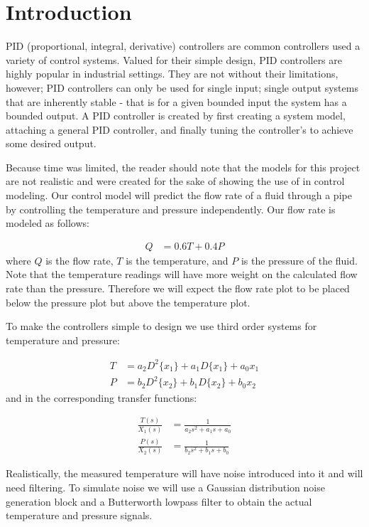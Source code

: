 \documentclass[main.tex]{subfile}
\begin{document}
\section{Introduction} 
\label{sec:introduction}

PID (proportional, integral, derivative) controllers are common controllers used
a variety of control systems. Valued for their simple design, PID controllers 
are highly popular in industrial settings. They are not without their limitations, 
however; PID controllers can only be used for single input; single
output systems that are inherently stable - that is for a given bounded input the
system has a bounded output. A PID controller is created by first creating a
system model, attaching a general PID controller, and finally tuning the
controller's to achieve some desired output. 

Because time was limited, the reader should note that the models for this
project are not realistic and were created for the sake of showing the use of
\Labview in control modeling. Our control model will predict the flow rate of a
fluid through a pipe by controlling the temperature and pressure independently.
Our flow rate is modeled as follows: 

\begin{align}
	Q &= 0.6T+0.4P \label{eq:flowRate}
\end{align}
where $Q$ is the flow rate, $T$ is the temperature, and $P$ is the pressure of
the fluid. Note that the temperature readings will have more weight on the
calculated flow rate than the pressure. Therefore we will expect the flow rate
plot to be placed below the pressure plot but above the temperature plot.

To make the controllers simple to design we use third order systems for
temperature and pressure:

\begin{align}
	T &= a_2D^2\{x_1\} + a_1D\{x_1\} + a_0x_1
	\\P &= b_2D^2\{x_2\} + b_1D\{x_2\} + b_0x_2
\end{align}
and in the corresponding transfer functions:

\begin{align}
	\frac{T(s)}{X_1(s)} &= \frac{1}{a_2s^2+a_1s+a_0}
	\\\frac{P(s)}{X_2(s)} &= \frac{1}{b_2s^2+b_1s+b_0}
\end{align}

Realistically, the measured temperature will have noise introduced into it and
will need filtering. To simulate noise we will use a Gaussian distribution
noise generation block and a Butterworth lowpass filter to obtain the actual
temperature and pressure signals.


\end{document}
